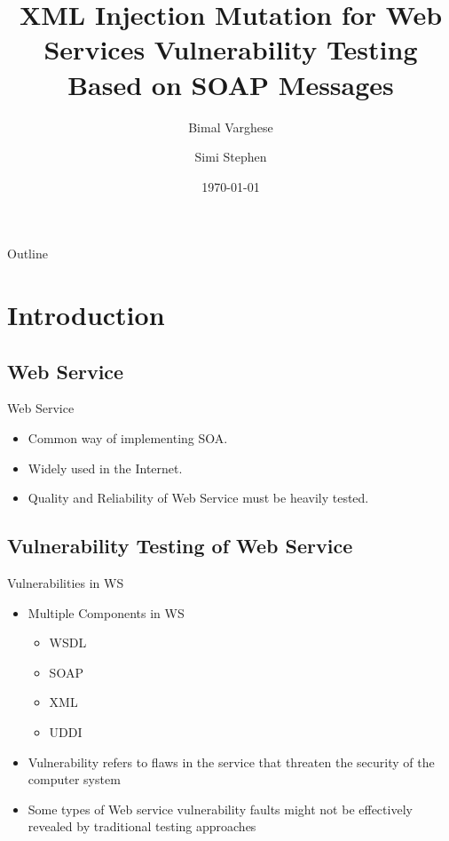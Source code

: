 \documentclass{beamer}
\title{XML Injection Mutation for Web Services Vulnerability Testing
	Based on SOAP Messages}
\author{Bimal Varghese \and Simi Stephen}
\institute[FISAT ] %
{
  Department of Computer Science and Engineering\\
  Federal Institute of Science and Technology\\
  Mookkannoor
  }
\date{\today}
\begin{document}
\begin{frame}
  \titlepage
\end{frame}

\begin{frame}{Outline}
  \tableofcontents
\end{frame}

\section{Introduction}

\subsection{Web Service}

\begin{frame}{Web Service}%
  \begin{itemize}
  \item {
    Common way of implementing SOA.
  }
  \item {
    Widely used in the Internet.
  }
  \item {
  	Quality and Reliability of Web Service must be heavily tested.
  	}
  \end{itemize}
\end{frame}

\subsection{Vulnerability Testing of Web Service}

\begin{frame}{Vulnerabilities in WS}
  \begin{itemize}
  \item {
    Multiple Components in WS
    \pause %
  }
  \begin{itemize}
  	\item WSDL \pause
  	\item SOAP \pause
  	\item XML \pause
  	\item UDDI \pause
  \end{itemize}
  \pause
  \item {   Vulnerability refers to flaws
  	in the service that threaten the security of the computer
  	system
    
  }
  \pause
  \item<3-> {
    Some types of
    Web service vulnerability faults might not be effectively
    revealed by traditional testing approaches
  }

  \end{itemize}
\end{frame}
\end{document}
